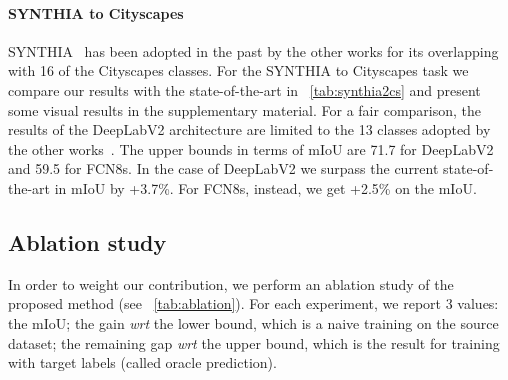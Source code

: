 \documentclass{bmvc2k}
\begin{document}
\paragraph{SYNTHIA to Cityscapes}
SYNTHIA~\cite{synthia} has been adopted in the past by the other works for its overlapping with 16 of the Cityscapes classes. For the SYNTHIA to Cityscapes task we compare our results with the state-of-the-art in \tablename~\ref{tab:synthia2cs} and present some visual results in the supplementary material. For a fair comparison, the results of the DeepLabV2 architecture are limited to the 13 classes adopted by the other works~\cite{adaptsegnet, clan, bdl}. The upper bounds in terms of mIoU are 71.7 for DeepLabV2 and 59.5 for FCN8s. In the case of DeepLabV2 we surpass the current state-of-the-art in mIoU by +3.7\%. For FCN8s, instead, we get +2.5\% on the mIoU.

\subsection{Ablation study}
\label{sec:ablation}

\begin{table}
	\begin{center}
		\caption{\textbf{Ablation study}. We report the mIoU, the gain \textit{wrt} the lower bound (\textit{i.e.} training naively on source), the gap \textit{wrt} the upper bound (\textit{i.e.} training on target).}
		\label{tab:ablation}
	\end{center}
\end{table}

In order to weight our contribution, we perform an ablation study of the proposed method (see \tablename~\ref{tab:ablation}). For each experiment, we report 3 values: the mIoU; the gain \textit{wrt} the lower bound, which is a naive training on the source dataset; the remaining gap \textit{wrt} the upper bound, which is the result for training with target labels (called oracle prediction).
\end{document}
